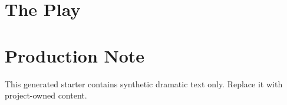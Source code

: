 \documentclass[10pt,twoside,openany]{book}
\begin{document}
\PSEBeginFrontMatter
\PSETitlePage
\PSEPublicationPage

\PSEPrintCastList
\tableofcontents
\clearpage
\PSEBeginBody
\chapter{The Play}

\PSEBeginBackMatter
\chapter*{Production Note}
This generated starter contains synthetic dramatic text only. Replace it with project-owned content.
\end{document}
